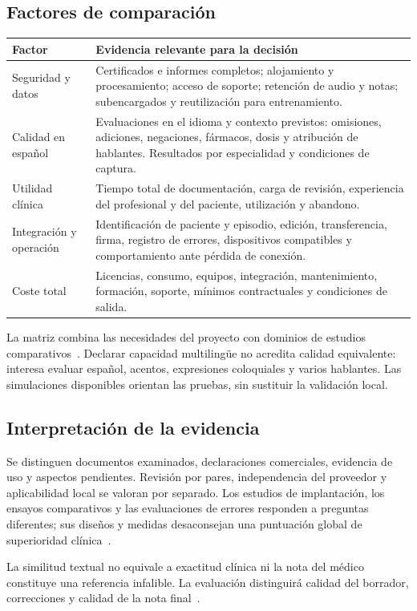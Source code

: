 \subsection{Factores de comparación}
\begin{small}
\begin{longtable}{L{.22\linewidth}L{.70\linewidth}}
\toprule
Factor & Evidencia relevante para la decisión \\
\midrule\endhead
Seguridad y datos & Certificados e informes completos; alojamiento y procesamiento; acceso de soporte; retención de audio y notas; subencargados y reutilización para entrenamiento. \\
Calidad en español & Evaluaciones en el idioma y contexto previstos: omisiones, adiciones, negaciones, fármacos, dosis y atribución de hablantes. Resultados por especialidad y condiciones de captura. \\
Utilidad clínica & Tiempo total de documentación, carga de revisión, experiencia del profesional y del paciente, utilización y abandono. \\
Integración y operación & Identificación de paciente y episodio, edición, transferencia, firma, registro de errores, dispositivos compatibles y comportamiento ante pérdida de conexión. \\
Coste total & Licencias, consumo, equipos, integración, mantenimiento, formación, soporte, mínimos contractuales y condiciones de salida. \\
\bottomrule
\end{longtable}
\end{small}
La matriz combina las necesidades del proyecto con dominios de estudios comparativos~\cite{NNWFT2JX,PRTISMYF}. Declarar capacidad multilingüe no acredita calidad equivalente: interesa evaluar español, acentos, expresiones coloquiales y varios hablantes. Las simulaciones disponibles orientan las pruebas, sin sustituir la validación local.

\subsection{Interpretación de la evidencia}
Se distinguen documentos examinados, declaraciones comerciales, evidencia de uso y aspectos pendientes. Revisión por pares, independencia del proveedor y aplicabilidad local se valoran por separado. Los estudios de implantación, los ensayos comparativos y las evaluaciones de errores responden a preguntas diferentes; sus diseños y medidas desaconsejan una puntuación global de superioridad clínica~\cite{956B6PZT}.

La similitud textual no equivale a exactitud clínica ni la nota del médico constituye una referencia infalible. La evaluación distinguirá calidad del borrador, correcciones y calidad de la nota final~\cite{4IHZ7QFQ,ZI87XIWC}.
